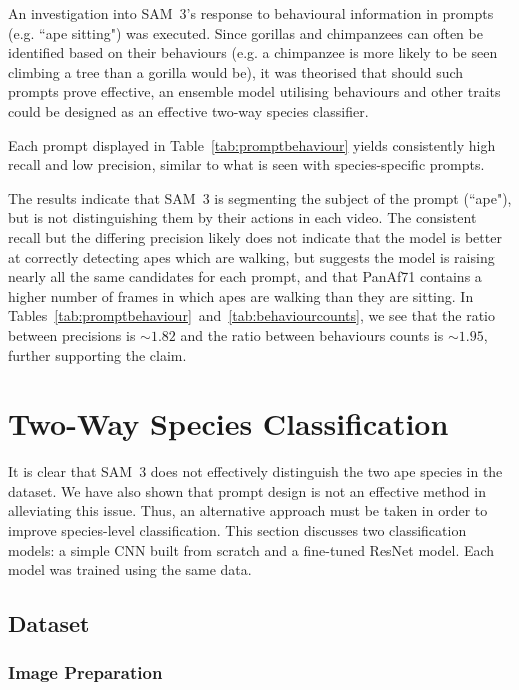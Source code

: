 \documentclass[author={Jacob Stephenson},
    degree={BSc},
    title={Robust Great Ape Species Detection in Wild Camera Trap Imagery with Promptable Concept Segmentation},
    unit={COMS30045},
    subtitle={}]{dissertation}
\begin{document}
An investigation into SAM~3's response to behavioural information in prompts (e.g. ``ape sitting") was executed. Since gorillas and chimpanzees can often be identified based on their behaviours (e.g. a chimpanzee is more likely to be seen climbing a tree than a gorilla would be), it was theorised that should such prompts prove effective, an ensemble model utilising behaviours and other traits could be designed as an effective two-way species classifier.




Each prompt displayed in Table~\ref{tab:promptbehaviour} yields consistently high recall and low precision, similar to what is seen with species-specific prompts.

The results indicate that SAM~3 is segmenting the subject of the prompt (``ape"), but is not distinguishing them by their actions in each video. The consistent recall but the differing precision likely does not indicate that the model is better at correctly detecting apes which are walking, but suggests the model is raising nearly all the same candidates for each prompt, and that PanAf71 contains a higher number of frames in which apes are walking than they are sitting. In Tables~\ref{tab:promptbehaviour}~and~\ref{tab:behaviourcounts}, we see that the ratio between precisions is $\sim 1.82$ and the ratio between behaviours counts is $\sim 1.95$, further supporting the claim.



\section{Two-Way Species Classification}
\label{sec:execution_classification2}

It is clear that SAM~3 does not effectively distinguish the two ape species in the dataset. We have also shown that prompt design is not an effective method in alleviating this issue. Thus, an alternative approach must be taken in order to improve species-level classification. This section discusses two classification models: a simple CNN built from scratch and a fine-tuned ResNet model. Each model was trained using the same data.

\subsection{Dataset}

\subsubsection{Image Preparation}
\end{document}
